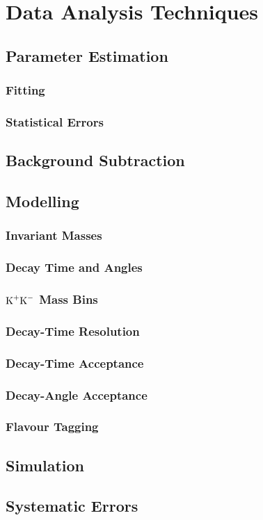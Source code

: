 \chapter{Data Analysis Techniques}

\section{Parameter Estimation}
\subsection{Fitting}
\subsection{Statistical Errors}
\section{Background Subtraction}
\section{Modelling}
\subsection{Invariant Masses}
\subsection{Decay Time and Angles}
\subsection{$\text{K}^+\text{K}^-$ Mass Bins}
\subsection{Decay-Time Resolution}
\subsection{Decay-Time Acceptance}
\subsection{Decay-Angle Acceptance}
\subsection{Flavour Tagging}
\section{Simulation}
\section{Systematic Errors}
